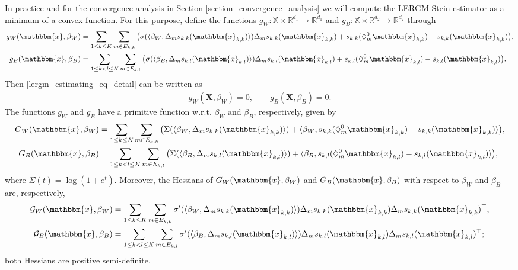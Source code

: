 \documentclass{article}
\begin{document}
In practice and for the convergence analysis in Section \ref{section_convergence_analysis} we will compute the LERGM-Stein estimator as a minimum of a convex function. For this purpose, define the functions $g_W: \mathbb{X} \times \mathbb{R}^{d_1} \rightarrow \mathbb{R}^{d_1} $ and $g_B: \mathbb{X} \times \mathbb{R}^{d_2} \rightarrow \mathbb{R}^{d_2} $ through
\begin{align*}
    g_W(\mathbbm{x},\beta_W) &= \sum_{1 \leq k \leq K} \sum_{m\in E_{k,k}}    \big( \sigma ( \langle \beta_W , \Delta_m s_{k,k}(\mathbbm{x}_{k,k}) \rangle )  \Delta_m s_{k,k}(\mathbbm{x}_{k,k}) +  s_{k,k}(\Diamond_{m}^{0} \mathbbm{x}_{k,k}) - s_{k,k}(\mathbbm{x}_{k,k}) \big), \\
    g_B(\mathbbm{x},\beta_B) &= \sum_{1 \leq k < l \leq K} \sum_{m\in E_{k,l}} \big( \sigma ( \langle \beta_B , \Delta_m s_{k,l}(\mathbbm{x}_{k,l}) \rangle )  \Delta_m s_{k,l}(\mathbbm{x}_{k,l}) + s_{k,l}(\Diamond_{m}^{0} \mathbbm{x}_{k,l}) - s_{k,l}(\mathbbm{x}_{k,l}) \big).
\end{align*}
Then \eqref{lergm_estimating_eq_detail} can be written as
\begin{align*}
   g_W(\mathbf{X},\beta_W) = 0, \qquad g_B(\mathbf{X},\beta_B) = 0.
\end{align*}
The functions $g_W$ and $g_B$ have a primitive function w.r.t.  $\beta_W$ and $\beta_B$, respectively, given by
\begin{align*}
    G_W(\mathbbm{x},\beta_W) &= \sum_{1 \leq k \leq K} \sum_{m\in E_{k,k}} \big( \Sigma ( \langle \beta_W , \Delta_m s_{k,k}(\mathbbm{x}_{k,k}) \rangle )  +  \langle \beta_W, s_{k,k}(\Diamond_{m}^{0}\mathbbm{x}_{k,k}) - s_{k,k}(\mathbbm{x}_{k,k}) \rangle \big), \\
    G_B(\mathbbm{x},\beta_B) &= \sum_{1 \leq k < l \leq K} \sum_{m\in E_{k,l}} \big( \Sigma ( \langle \beta_B , \Delta_m s_{k,l}(\mathbbm{x}_{k,l}) \rangle ) + \langle \beta_B, s_{k,l}(\Diamond_{m}^{0}\mathbbm{x}_{k,l}) - s_{k,l}(\mathbbm{x}_{k,l}) \rangle \big),
\end{align*}
where $\Sigma(t)=\log(1+e^t)$. Moreover, the Hessians of $G_W(\mathbbm{x}, \beta_W)$ and $G_B(\mathbbm{x}, \beta_B)$ with respect to $\beta_W$ and $\beta_B$ are, respectively, 
\begin{align} \label{target_function_hessian}
\begin{split}
    \mathcal{G}_W(\mathbbm{x},\beta_W) &= \sum_{1 \leq k \leq K} \sum_{m\in E_{k,k}} \sigma' ( \langle \beta_W , \Delta_m s_{k,k}(\mathbbm{x}_{k,k}) \rangle )\Delta_m s_{k,k}(\mathbbm{x}_{k,k})\Delta_m s_{k,k}(\mathbbm{x}_{k,k})^{\top} , \\ 
    \mathcal{G}_B(\mathbbm{x},\beta_B) &= \sum_{1 \leq k < l \leq K} \sum_{m\in E_{k,l}} \sigma' ( \langle \beta_B , \Delta_m s_{k,l}(\mathbbm{x}_{k,l}) \rangle ) \Delta_ms_{k,l}(\mathbbm{x}_{k,l})\Delta_m s_{k,l}(\mathbbm{x}_{k,l})^{\top}; 
\end{split}
\end{align}
both Hessians are positive semi-definite. 
\end{document}

